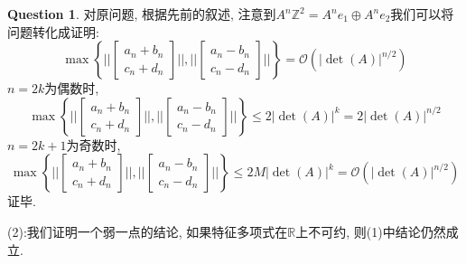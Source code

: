 \documentclass[12pt,a4paper]{ctexart}
\newcommand{\bbrace}[1]{\left\{ #1 \right\} }
\newcommand{\bb}[1]{\mathbb{#1}}
\theoremstyle{definition}
\newtheorem{ques}[defn]{Question}
\begin{document}
\begin{ques}
    对原问题, 根据先前的叙述, 注意到$A^n\bb{Z}^2=A^ne_1 \oplus A^n e_2$我们可以将问题转化成证明:
    \begin{equation*}
        \max\bbrace{||\begin{bmatrix}
                a_n+b_n \\  c_n+d_n
            \end{bmatrix}||,||\begin{bmatrix}
                a_n-b_n \\  c_n-d_n
            \end{bmatrix}||
        }=\mathcal{O}(|\det(A)|^{n/2})
    \end{equation*}
    $n=2k$为偶数时,
    \begin{equation*}
        \max\bbrace{||\begin{bmatrix}
                a_n+b_n \\  c_n+d_n
            \end{bmatrix}||,||\begin{bmatrix}
                a_n-b_n \\  c_n-d_n
            \end{bmatrix}||
        }\le 2|\det(A)|^k=2|\det(A)|^{n/2}
    \end{equation*}
    $n=2k+1$为奇数时,
    \begin{equation*}
        \max\bbrace{||\begin{bmatrix}
                a_n+b_n \\  c_n+d_n
            \end{bmatrix}||,||\begin{bmatrix}
                a_n-b_n \\  c_n-d_n
            \end{bmatrix}||
        }\le 2M |\det(A)|^k =\mathcal{O}(|\det(A)|^{n/2})
    \end{equation*}
    证毕.

    (2):我们证明一个弱一点的结论, 如果特征多项式在$\bb{R}$上不可约, 则(1)中结论仍然成立.


\end{ques}
\end{document}
